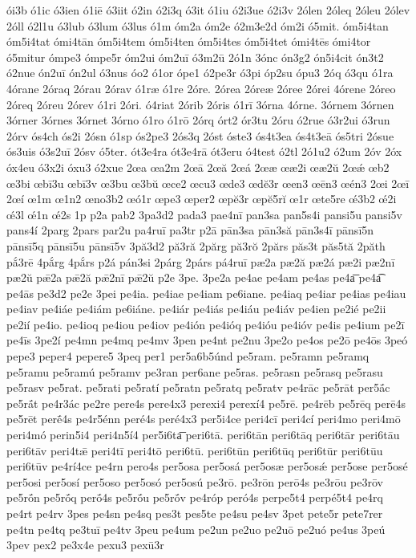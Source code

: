 {ói3b
ó1ic
ó3ien
ó1iē
ó3iit
ó2in
ó2i3q
ó3it
ó1iu
ó2i3ue
ó2i3v
2ólen
2óleq
2óleu
2ólev
2óll
ó2l1u
ó3lub
ó3lum
ó3lus
ó1m
óm2a
óm2e
ó2m3e2d
óm2i
ó5mit.
óm5i4tan
óm5i4tat
ómi4tān
óm5i4tem
óm5i4ten
óm5i4tes
óm5i4tet
ómi4tēs
ómi4tor
ó5mitur
ómpe3
ómpe5r
óm2ui
óm2uī
ó3m2ū
2ó1n
3ónc
ón3g2
ón5i4cit
ón3t2
ó2nue
ón2uī
ón2ul
ó3nus
óo2
ó1or
ópe1
ó2pe3r
ó3pi
óp2su
ópu3
2óq
ó3qu
ó1ra
4órane
2óraq
2órau
2órav
ó1ræ
ó1re
2óre.
2órea
2óreæ
2óree
2órei
4órene
2óreo
2óreq
2óreu
2órev
ó1ri
2óri.
ó4riat
2órib
2óris
ó1rī
3órna
4órne.
3órnem
3órnen
3órner
3órnes
3órnet
3órno
ó1ro
ó1rō
2órq
órt2
ór3tu
2óru
ó2rue
ó3r2ui
ó3run
2órv
ós4ch
ós2i
2ósn
ó1sp
ós2pe3
2ós3q
2óst
óste3
ós4t3ea
ós4t3eā
ós5tri
2ósue
ós3uis
ó3s2uī
2ósv
ó5ter.
ót3e4ra
ót3e4rā
ót3eru
ó4test
ó2tl
2ó1u2
ó2um
2óv
2óx
óx4eu
ó3x2i
óxu3
ó2xue
2œa
œa2m
2œā
2œă
2œá
2œæ
œæ2i
œæ2ŭ
2œǽ
œb2
œ3bi
œbī3u
œbī3v
œ3bu
œ3bŭ
œce2
œcu3
œde3
œdĕ3r
œen3
œēn3
œén3
2œi
2œī
2œí
œ1m
œ1n2
œno3b2
œó1r
œpe3
œper2
œpĕ3r
œpĕ5rĭ
œ1r
œte5re
œ́3b2
œ́2i
œ́3l
œ́1n
œ́2s
1p
p2a
pab2
3pa3d2
pada3
pae4nī
pan3sa
pan5s4i
pansi5u
pansi5v
pans4í
2parg
2pars
par2u
pa4ruī
pa3tr
p2ā
pān3sa
pān3să
pān3s4ī
pānsī5n
pānsī5q
pānsī5u
pānsī5v
3pă3d2
pă3ră
2părg
pă3rŏ
2părs
păs3t
păs5tă
2păth
pắ3rē
4pắrg
4pắrs
p2á
pán3si
2párg
2párs
pá4ruī
pæ2a
pæ2ă
pæ2á
pæ2i
pæ2nī
pæ2ŭ
pǣ2a
pǣ2ă
pǣ2nī
pǣ2ŭ
p2e
3pe.
3pe2a
pe4ae
pe4am
pe4as
pe4a͞
pe4a͡
pe4ās
pe3d2
pe2e
3pei
pe4ia.
pe4iae
pe4iam
pe6iane.
pe4iaq
pe4iar
pe4ias
pe4iau
pe4iav
pe4iáe
pe4iám
pe6iáne.
pe4iár
pe4iás
pe4iáu
pe4iáv
pe4ien
pe2ié
pe2ii
pe2ií
pe4io.
pe4ioq
pe4iou
pe4iov
pe4ión
pe4ióq
pe4ióu
pe4ióv
pe4is
pe4ium
pe2ī
pe4īs
3pe2í
pe4mn
pe4mq
pe4mv
3pen
pe4nt
pe2nu
3pe2o
pe4os
pe2ō
pe4ōs
3peó
pepe3
peper4
pepere5
3peq
per1
per5a6b5únd
pe5ram.
pe5ramn
pe5ramq
pe5ramu
pe5ramú
pe5ramv
pe3ran
per6ane
pe5ras.
pe5rasn
pe5rasq
pe5rasu
pe5rasv
pe5rat.
pe5rati
pe5ratí
pe5ratn
pe5ratq
pe5ratv
pe4rāc
pe5rāt
per5ā́c
pe5rā́t
pe4r3ác
pe2re
pere4s
pere4x3
perexi4
perexí4
pe5rē.
pe4rēb
pe5rēq
perē4s
pe5rēt
perḗ4s
pe4r5énn
peré4s
peré4x3
per5i4ce
peri4cī
peri4cí
peri4mo
peri4mō
peri4mó
perin5i4
peri4n5í4
per5i6ta͞
peri6tā.
peri6tān
peri6tāq
peri6tār
peri6tāu
peri6tāv
peri4tǣ
peri4tī
peri4tō
peri6tū.
peri6tūn
peri6tūq
peri6tūr
peri6tūu
peri6tūv
pe4rí4ce
pe4rn
pero4s
per5osa
per5osá
per5osæ
per5osǽ
per5ose
per5osé
per5osi
per5osí
per5oso
per5osó
per5osú
pe3rō.
pe3rōn
perō4s
pe3rōu
pe3rōv
pe5rṓn
pe5rṓq
perṓ4s
pe5rṓu
pe5rṓv
pe4róp
peró4s
perpe5t4
perpé5t4
pe4rq
pe4rt
pe4rv
3pes
pe4sn
pe4sq
pes3t
pes5te
pe4su
pe4sv
3pet
pete5r
pete7rer
pe4tn
pe4tq
pe3tuī
pe4tv
3peu
pe4um
pe2un
pe2uo
pe2uō
pe2uó
pe4us
3peú
3pev
pex2
pe3x4e
pexu3
pexū3r
}
